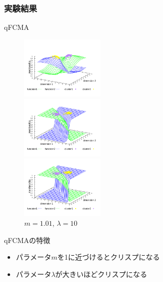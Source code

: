 \documentclass[13pt,dvipdfmx]{beamer}
\begin{document}
\begin{frame}\frametitle{実験結果}
  \begin{block}{qFCMA}
    \begin{figure}[htbp]
      \begin{minipage}{0.32\hsize}
        \begin{center}
          \includegraphics[width=40mm]{qFCMA-Em2-Lambda1.pdf}
        \end{center}
        \captionsetup{labelformat=empty,labelsep=none}
        \caption{$m=2.00$\;, \;$\lambda=1$}
        \label{fig:one}
      \end{minipage}
      \begin{minipage}{0.32\hsize}
        \begin{center}
          \includegraphics[width=40mm]{qFCMA-Em11-Lambda1.pdf}
        \end{center}
        \captionsetup{labelformat=empty,labelsep=none}
        \caption{$m=1.01$\;, \;$\lambda=1$}
        \label{fig:two}
      \end{minipage}
     \begin{minipage}{0.32\hsize}
      \begin{center}
       \includegraphics[width=40mm]{qFCMA-Em11-Lambda10.pdf}
      \end{center}
      \captionsetup{labelformat=empty,labelsep=none}
      \caption{$m=1.01$\;, \;$\lambda=10$}
      \label{fig:two}
     \end{minipage}
    \end{figure}
  \end{block}
  \begin{block}{qFCMAの特徴}
    \begin{itemize}
     \item パラメータ$m$を1に近づけるとクリスプになる
     \item パラメータ$\lambda$が大きいほどクリスプになる
    \end{itemize}
  \end{block}
\end{frame}
\end{document}
